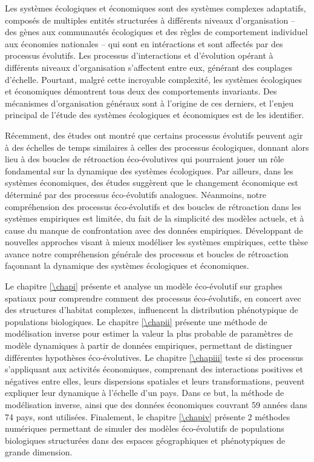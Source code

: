 \small{
\noindent Les systèmes écologiques et économiques sont des systèmes complexes adaptatifs, composés de multiples entités structurées à différents niveaux d'organisation -- des gènes aux communautés écologiques et des règles de comportement individuel aux économies nationales -- qui sont en intéractions et sont affectés par des processus évolutifs. Les processus d'interactions et d'évolution opérant à différents niveaux d'organisation s'affectent entre eux, générant des couplages d'échelle. Pourtant, malgré cette incroyable complexité, les systèmes écologiques et économiques démontrent tous deux des comportements invariants. Des mécanismes d'organisation généraux sont à l'origine de ces derniers, et l'enjeu principal de l'étude des systèmes écologiques et économiques est de les identifier.
 
Récemment, des études ont montré que certains processus évolutifs peuvent agir à des échelles de temps similaires à celles des processus écologiques, donnant alors lieu à des boucles de rétroaction éco-évolutives qui pourraient jouer un rôle fondamental sur la dynamique des systèmes écologiques. Par ailleurs, dans les systèmes économiques, des études suggèrent que le changement économique est déterminé par des processus éco-évolutifs analogues. Néanmoins, notre compréhension des processus éco-évolutifs et des boucles de rétroaction dans les systèmes empiriques est limitée, du fait de la simplicité des modèles actuels, et à cause du manque de confrontation avec des données empiriques.  Développant de nouvelles approches visant à mieux modéliser les systèmes empiriques, cette thèse avance notre compréhension générale des processus et boucles de rétroaction façonnant la dynamique des systèmes écologiques et économiques.
 
Le chapitre \ref{\chapi} présente et analyse un modèle éco-évolutif sur graphes spatiaux pour comprendre comment des processus éco-évolutifs, en concert avec des structures d'habitat complexes, influencent la distribution phénotypique de populations biologiques. Le chapitre \ref{\chapii} présente une méthode de modélisation inverse pour estimer la valeur la plus probable de paramètres de modèle dynamiques à partir de données empiriques, permettant de distinguer différentes hypothèses éco-évolutives. Le chapitre \ref{\chapiii} teste si des processus s'appliquant aux activités économiques, comprenant des interactions positives et négatives entre elles, leurs dispersions spatiales et leurs transformations, peuvent expliquer leur dynamique à l'échelle d'un pays. Dans ce but, la méthode de modélisation inverse, ainsi que des données économiques couvrant 59 années dans 74 pays, sont utilisées. Finalement, le chapitre \ref{\chapiv} présente 2 méthodes numériques permettant de simuler des modèles éco-évolutifs de populations biologiques structurées dans des espaces géographiques et phénotypiques de grande dimension.
 
}
